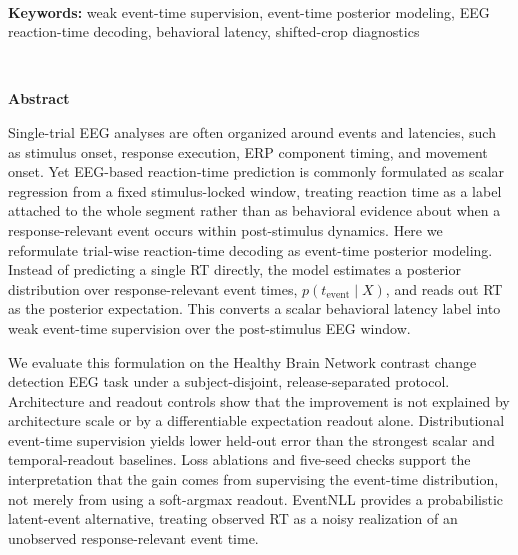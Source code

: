 \documentclass[12pt]{article}
\begin{document}
\ \\[-2mm]
{\bf Keywords:} weak event-time supervision, event-time posterior modeling, EEG reaction-time decoding, behavioral latency, shifted-crop diagnostics

\thispagestyle{empty}
%
\ \vspace{-0mm}\\
%
\begin{center} {\bf Abstract} \end{center}



Single-trial EEG analyses are often organized around events and latencies, such as stimulus onset, response execution, ERP component timing, and movement onset. Yet EEG-based reaction-time prediction is commonly formulated as scalar regression from a fixed stimulus-locked window, treating reaction time as a label attached to the whole segment rather than as behavioral evidence about when a response-relevant event occurs within post-stimulus dynamics. Here we reformulate trial-wise reaction-time decoding as event-time posterior modeling. Instead of predicting a single RT directly, the model estimates a posterior distribution over response-relevant event times, \(p(t_{\mathrm{event}} \mid X)\), and reads out RT as the posterior expectation. This converts a scalar behavioral latency label into weak event-time supervision over the post-stimulus EEG window.

We evaluate this formulation on the Healthy Brain Network contrast change detection EEG task under a subject-disjoint, release-separated protocol. Architecture and readout controls show that the improvement is not explained by architecture scale or by a differentiable expectation readout alone. Distributional event-time supervision yields lower held-out error than the strongest scalar and temporal-readout baselines. Loss ablations and five-seed checks support the interpretation that the gain comes from supervising the event-time distribution, not merely from using a soft-argmax readout. EventNLL provides a probabilistic latent-event alternative, treating observed RT as a noisy realization of an unobserved response-relevant event time.
\end{document}
